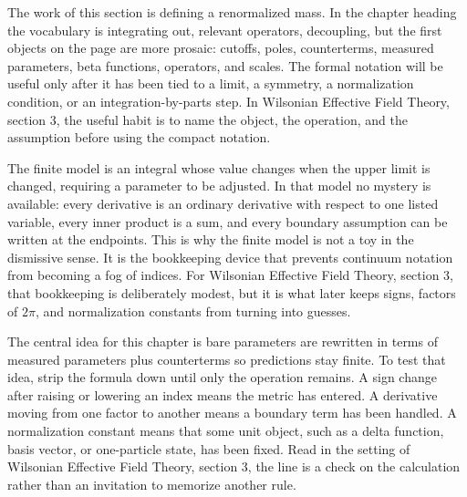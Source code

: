 











The work of this section is defining a renormalized mass.  In the chapter heading the vocabulary is integrating out, relevant operators, decoupling, but the first objects on the page are more prosaic: cutoffs, poles, counterterms, measured parameters, beta functions, operators, and scales.  The formal notation will be useful only after it has been tied to a limit, a symmetry, a normalization condition, or an integration-by-parts step.  In Wilsonian Effective Field Theory, section 3, the useful habit is to name the object, the operation, and the assumption before using the compact notation.

The finite model is an integral whose value changes when the upper limit is changed, requiring a parameter to be adjusted.  In that model no mystery is available: every derivative is an ordinary derivative with respect to one listed variable, every inner product is a sum, and every boundary assumption can be written at the endpoints.  This is why the finite model is not a toy in the dismissive sense.  It is the bookkeeping device that prevents continuum notation from becoming a fog of indices.  For Wilsonian Effective Field Theory, section 3, that bookkeeping is deliberately modest, but it is what later keeps signs, factors of \(2\pi\), and normalization constants from turning into guesses.

The central idea for this chapter is bare parameters are rewritten in terms of measured parameters plus counterterms so predictions stay finite.  To test that idea, strip the formula down until only the operation remains.  A sign change after raising or lowering an index means the metric has entered.  A derivative moving from one factor to another means a boundary term has been handled.  A normalization constant means that some unit object, such as a delta function, basis vector, or one-particle state, has been fixed.  Read in the setting of Wilsonian Effective Field Theory, section 3, the line is a check on the calculation rather than an invitation to memorize another rule.

